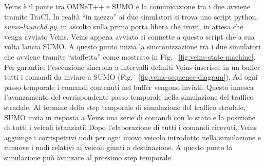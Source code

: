 Veins è il ponte tra OMNeT++ e SUMO e la comunicazione tra i due avviene tramite TraCI. In realtà ``in mezzo'' ai due simulatori si trova uno script python, \emph{sumo-launchd.py}, in ascolto sulla prima porta libera che trova, in attesa che venga avviato Veins. Veins appena avviato si connette a questo script che a sua volta lancia SUMO. A questo punto inizia la sincronizzazione tra i due simulatori che avviene tramite ``staffetta'' come mostrato in Fig. ~\ref{fig:veins-state-machine}. Per garantire l'esecuzione sincrona a intervalli definiti Veins inserisce in un buffer tutti i comandi da inviare a SUMO (Fig.  ~\ref{fig:veins-sequence-diagram}). Ad ogni passo temporale i comandi contenuti nel buffer vengono inviati. Questo innesca l'avanzamento del corrispondente passo temporale nella simulazione del traffico stradale. Al termine dello step temporale di simulazione del traffico stradale, SUMO invia in risposta a Veins una serie di comandi con lo stato e la posizione di tutti i veicoli istanziati. Dopo l'elaborazione di tutti i comandi ricevuti, Veins aggiunge i corrispettivi nodi per ogni nuovo veicolo introdotto nella simulazione e rimuove i nodi relativi ai veicoli giunti a destinazione. A questo punto la simulazione può avanzare al prossimo step temporale.

